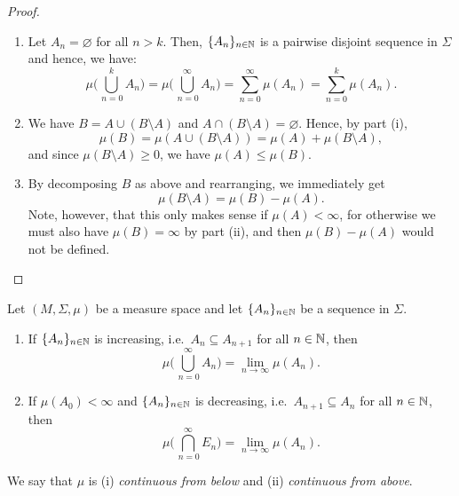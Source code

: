\begin{proof}
\begin{enumerate}[label=(\roman*)]
\item Let $A_n=\varnothing$ for all $n>k$. Then, $\{A_n\}_{n\in\mathbb{N}}$ is a pairwise disjoint sequence in $\Sigma$ and hence, we have:
\begin{equation*}
\mu \biggl( \bigcup_{\,n=0}^{k}A_n\biggr) =\mu \biggl( \bigcup_{\,n=0}^{\infty}A_n\biggr) = \sum_{n=0}^{\infty}\mu(A_n)= \sum_{n=0}^{k}\mu(A_n).
\end{equation*}
\item We have $B=A\cup (B\setminus A)$ and $A\cap (B\setminus A)=\varnothing$. Hence, by part (i),
\begin{equation*}
\mu(B)= \mu(A\cup (B\setminus A))=\mu(A)+\mu ( B\setminus A),
\end{equation*}
and since $\mu ( B\setminus A)\geq 0$, we have $ \mu(A) \leq \mu(B)$.
\item By decomposing $B$ as above and rearranging, we immediately get
\begin{equation*}
\mu(B\setminus A)=\mu(B)-\mu(A).
\end{equation*}
Note, however, that this only makes sense if $\mu(A)<\infty$, for otherwise we must also have $\mu(B)=\infty$ by part (ii), and then $\mu(B)-\mu(A)$ would not be defined.
\qedhere
\end{enumerate}
\end{proof}

\begin{proposition}
Let $(M,\Sigma,\mu)$ be a measure space and let $\{A_n\}_{n\in \mathbb{N}}$ be a sequence in $\Sigma$.
\begin{enumerate}[label=(\roman*)]
\item If $\{A_n\}_{n\in \mathbb{N}}$ is increasing, i.e.\ $A_n\subseteq A_{n+1}$ for all $n \in \mathbb{N}$, then
\begin{equation*}
\mu \biggl( \bigcup_{\,n=0}^{\infty}A_n\biggr) = \lim_{n \to \infty} \mu(A_n).
\end{equation*}
\item If $\mu(A_0)<\infty$ and $\{A_n\}_{n\in \mathbb{N}}$ is decreasing, i.e.\ $ A_{n+1}\subseteq A_n$ for all $n \in \mathbb{N}$, then
\begin{equation*}
\mu \biggl(  \bigcap_{\,n=0}^{\infty}E_n\biggr) = \lim_{n \to \infty} \mu(A_n).
\end{equation*}
\end{enumerate}
\end{proposition}
We say that $\mu$ is (i) \emph{continuous from below} and (ii) \emph{continuous from above}.

